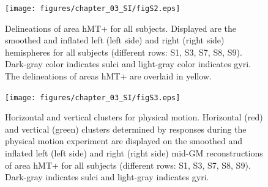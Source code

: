 \begin{figure}[htb!]
\captionsetup{labelformat=empty}
\centering
\texttt{[image: figures/chapter\_03\_SI/figS2.eps]}
\caption{}
\end{figure}

\begin{figure}[ht!]
\ContinuedFloat
\captionsetup{labelformat=adja-page}
\caption{Delineations of area hMT+ for all subjects. Displayed are the smoothed and inflated left (left side) and right (right side) hemispheres for all subjects (different rows: S1, S3, S7, S8, S9). Dark-gray color indicates sulci and light-gray color indicates gyri. The delineations of areas hMT+ are overlaid in yellow.}
\label{fig:figE_MtLoc}
\noindent\hrulefill
\end{figure}

\begin{figure}[htb!]
\captionsetup{labelformat=empty}
\centering
\texttt{[image: figures/chapter\_03\_SI/figS3.eps]}
\caption{}
\end{figure}

\begin{figure}[ht!]
\ContinuedFloat
\captionsetup{labelformat=adja-page}
\caption{Horizontal and vertical clusters for physical motion. Horizontal (red) and vertical (green) clusters determined by responses during the physical motion experiment are displayed on the smoothed and inflated left (left side) and right (right side) mid-GM reconstructions of area hMT+ for all subjects (different rows: S1, S3, S7, S8, S9). Dark-gray indicates sulci and light-gray indicates gyri.}
\label{fig:figG_clusters}
\noindent\hrulefill
\end{figure}


